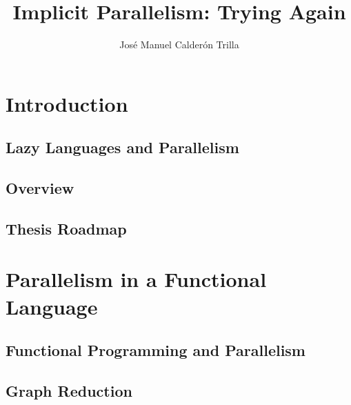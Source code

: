 \documentclass[justified, twoside, a4paper, symmetric]{tufte-book}
\title{Implicit Parallelism: Trying Again}
\author{Jos\'{e} Manuel Calder\'{o}n Trilla}
\newcommand{\blankpage}{\newpage\hbox{}\thispagestyle{empty}\newpage}
\begin{document}
\frontmatter


\maketitle

\tableofcontents
\listoffigures
\listoftables

\mainmatter

\chapter{Introduction}

    
    
    \section{Lazy Languages and Parallelism}
    

    \section{Overview}
    

    \section{Thesis Roadmap}

\chapter{Parallelism in a Functional Language}

    

    \section{Functional Programming and Parallelism}
    
    
    \section{Graph Reduction}
    
\end{document}
